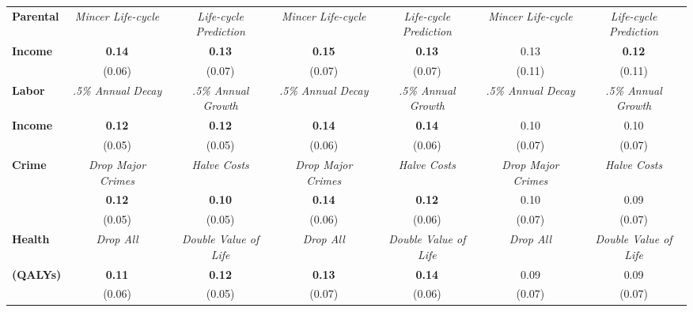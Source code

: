 \begin{tabular}{>{\bfseries}lcc|cc|cc}
Parental	&	\textit{Mincer Life-cycle}	&	\textit{Life-cycle Prediction}	&	\textit{Mincer Life-cycle}	&	\textit{Life-cycle Prediction}	&	\textit{Mincer Life-cycle}	&	\textit{Life-cycle Prediction}	\\
Income	&	\textbf{0.14}	&	\textbf{0.13}	&	\textbf{0.15}	&	\textbf{0.13}	&	0.13	&	\textbf{0.12}	\\
	&	(0.06)	&	(0.07)	&	(0.07)	&	(0.07)	&	(0.11)	&	(0.11)	\\ \midrule
Labor	&	\textit{.5\% Annual Decay}	&	\textit{.5\% Annual Growth}	&	\textit{.5\% Annual Decay}	&	\textit{.5\% Annual Growth}	&	\textit{.5\% Annual Decay}	&	\textit{.5\% Annual Growth}	\\
Income	&	\textbf{0.12}	&	\textbf{0.12}	&	\textbf{0.14}	&	\textbf{0.14}	&	0.10	&	0.10	\\
	&	(0.05)	&	(0.05)	&	(0.06)	&	(0.06)	&	(0.07)	&	(0.07)	\\ \midrule
Crime	&	\textit{Drop Major Crimes}	&	\textit{Halve Costs}	&	\textit{Drop Major Crimes}	&	\textit{Halve Costs}	&	\textit{Drop Major Crimes}	&	\textit{Halve Costs}	\\
	&	\textbf{0.12}	&	\textbf{0.10}	&	\textbf{0.14}	&	\textbf{0.12}	&	0.10	&	0.09	\\
	&	(0.05)	&	(0.05)	&	(0.06)	&	(0.06)	&	(0.07)	&	(0.07)	\\ \midrule
Health	&	\textit{Drop All}	&	\textit{Double Value of Life}	&	\textit{Drop All}	&	\textit{Double Value of Life}	&	\textit{Drop All}	&	\textit{Double Value of Life}	\\
(QALYs)	&	\textbf{0.11}	&	\textbf{0.12}	&	\textbf{0.13}	&	\textbf{0.14}	&	0.09	&	0.09	\\
	&	(0.06)	&	(0.05)	&	(0.07)	&	(0.06)	&	(0.07)	&	(0.07)	\\ \bottomrule
\end{tabular} 